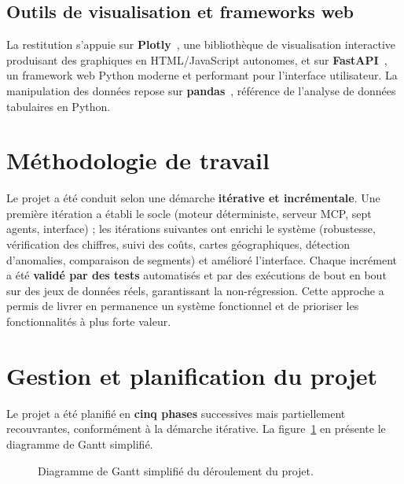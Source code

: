 \subsection{Outils de visualisation et frameworks web}
La restitution s'appuie sur \textbf{Plotly}~\cite{plotly}, une bibliothèque de
visualisation interactive produisant des graphiques en HTML/JavaScript
autonomes, et sur \textbf{FastAPI}~\cite{fastapi}, un framework web Python
moderne et performant pour l'interface utilisateur. La manipulation des
données repose sur \textbf{pandas}~\cite{pandas}, référence de l'analyse de
données tabulaires en Python.

\section{Méthodologie de travail}
Le projet a été conduit selon une démarche \textbf{itérative et incrémentale}.
Une première itération a établi le socle (moteur déterministe, serveur MCP,
sept agents, interface) ; les itérations suivantes ont enrichi le système
(robustesse, vérification des chiffres, suivi des coûts, cartes
géographiques, détection d'anomalies, comparaison de segments) et amélioré
l'interface. Chaque incrément a été \textbf{validé par des tests}
automatisés et par des exécutions de bout en bout sur des jeux de données
réels, garantissant la non-régression. Cette approche a permis de livrer en
permanence un système fonctionnel et de prioriser les fonctionnalités à plus
forte valeur.

\section{Gestion et planification du projet}
Le projet a été planifié en \textbf{cinq phases} successives mais partiellement
recouvrantes, conformément à la démarche itérative. La
figure~\ref{fig:gantt} en présente le diagramme de Gantt simplifié.

\begin{figure}[ht]
\centering
{}
\caption{Diagramme de Gantt simplifié du déroulement du projet.}
\label{fig:gantt}
\end{figure}

